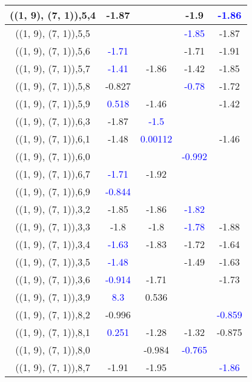 \documentclass{article}
\begin{document}
\begin{center}
\begin{longtable}{|c|c|c|c|c|}
        	\hline
        	((1, 9), (7, 1)),5,4&-1.87&&-1.9& \textcolor{blue}{-1.86}\\
        	\hline
        	((1, 9), (7, 1)),5,5&&& \textcolor{blue}{-1.85}&-1.87\\
        	\hline
        	((1, 9), (7, 1)),5,6& \textcolor{blue}{-1.71}&&-1.71&-1.91\\
        	\hline
        	((1, 9), (7, 1)),5,7& \textcolor{blue}{-1.41}&-1.86&-1.42&-1.85\\
        	\hline
        	((1, 9), (7, 1)),5,8&-0.827&& \textcolor{blue}{-0.78}&-1.72\\
        	\hline
        	((1, 9), (7, 1)),5,9& \textcolor{blue}{0.518}&-1.46&&-1.42\\
        	\hline
        	((1, 9), (7, 1)),6,3&-1.87& \textcolor{blue}{-1.5}&&\\
        	\hline
        	((1, 9), (7, 1)),6,1&-1.48& \textcolor{blue}{0.00112}&&-1.46\\
        	\hline
        	((1, 9), (7, 1)),6,0&&& \textcolor{blue}{-0.992}&\\
        	\hline
        	((1, 9), (7, 1)),6,7& \textcolor{blue}{-1.71}&-1.92&&\\
        	\hline
        	((1, 9), (7, 1)),6,9& \textcolor{blue}{-0.844}&&&\\
        	\hline
        	((1, 9), (7, 1)),3,2&-1.85&-1.86& \textcolor{blue}{-1.82}&\\
        	\hline
        	((1, 9), (7, 1)),3,3&-1.8&-1.8& \textcolor{blue}{-1.78}&-1.88\\
        	\hline
        	((1, 9), (7, 1)),3,4& \textcolor{blue}{-1.63}&-1.83&-1.72&-1.64\\
        	\hline
        	((1, 9), (7, 1)),3,5& \textcolor{blue}{-1.48}&&-1.49&-1.63\\
        	\hline
        	((1, 9), (7, 1)),3,6& \textcolor{blue}{-0.914}&-1.71&&-1.73\\
        	\hline
        	((1, 9), (7, 1)),3,9& \textcolor{blue}{8.3}&0.536&&\\
        	\hline
        	((1, 9), (7, 1)),8,2&-0.996&&& \textcolor{blue}{-0.859}\\
        	\hline
        	((1, 9), (7, 1)),8,1& \textcolor{blue}{0.251}&-1.28&-1.32&-0.875\\
        	\hline
        	((1, 9), (7, 1)),8,0&&-0.984& \textcolor{blue}{-0.765}&\\
        	\hline
        	((1, 9), (7, 1)),8,7&-1.91&-1.95&& \textcolor{blue}{-1.86}\\

\end{longtable}
\end{center}
\end{document}
